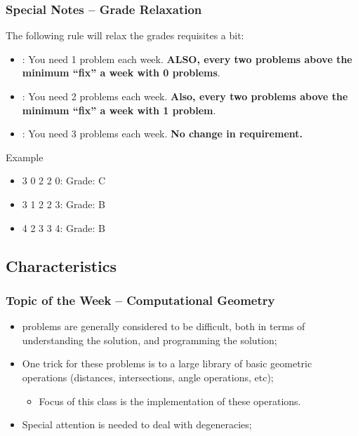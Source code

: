 \documentclass{beamer}
\begin{document}
\begin{frame}
  \frametitle{Special Notes -- Grade Relaxation}
  {\smaller
    The following rule will relax the grades requisites a bit:

    \begin{itemize}      
      \item {}: You need 1 problem each
        week. {\bf ALSO, every two problems above the minimum
          ``fix'' a week with 0 problems}.

      \item {}: You need 2 problems each
        week. {\bf Also, every two problems above the minimum
          ``fix'' a week with 1 problem}.
        
      \item {}: You need 3 problems each
        week. {\bf No change in requirement.}
    \end{itemize}

    \vfill

    \begin{block}{Example}
      \begin{itemize}
      \item 3 0 2 2 0: Grade: C
      \item 3 1 2 2 3: Grade: B
      \item 4 2 3 3 4: Grade: B
      \end{itemize}
    \end{block}
  }
\end{frame}

\subsection{Characteristics}
\begin{frame}
  \frametitle{Topic of the Week -- Computational Geometry}
  {\small
  
    \begin{itemize}
    \item {} problems are generally
      considered to be difficult, both in terms of understanding the
      solution, and programming the solution;

      \vfill

    \item One trick for these problems is to  a
      large library of basic geometric operations (distances,
      intersections, angle operations, etc); \\

      \begin{itemize}
        \item {\smaller Focus of this class is the implementation of these
          operations.}
      \end{itemize}

      \vfill

    \item Special attention is needed to deal with \alert{degeneracies};
    \end{itemize}
  }
\end{frame}
\end{document}
